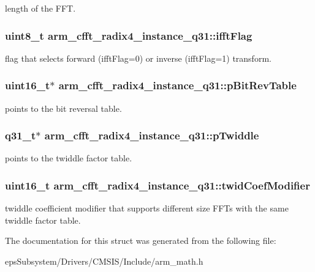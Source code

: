 length of the F\-F\-T. \hypertarget{structarm__cfft__radix4__instance__q31_adc0a62ba669ad2282ecbe43d5d96abab}{
\subsubsection[{ifft\-Flag}]{\setlength{\rightskip}{0pt plus 5cm}uint8\-\_\-t arm\-\_\-cfft\-\_\-radix4\-\_\-instance\-\_\-q31\-::ifft\-Flag}}\label{structarm__cfft__radix4__instance__q31_adc0a62ba669ad2282ecbe43d5d96abab}
flag that selects forward (ifft\-Flag=0) or inverse (ifft\-Flag=1) transform. \hypertarget{structarm__cfft__radix4__instance__q31_a33a3bc774c97373261699463c05dfe54}{
\subsubsection[{p\-Bit\-Rev\-Table}]{\setlength{\rightskip}{0pt plus 5cm}uint16\-\_\-t$\ast$ arm\-\_\-cfft\-\_\-radix4\-\_\-instance\-\_\-q31\-::p\-Bit\-Rev\-Table}}\label{structarm__cfft__radix4__instance__q31_a33a3bc774c97373261699463c05dfe54}
points to the bit reversal table. \hypertarget{structarm__cfft__radix4__instance__q31_a561c22dee4cbdcfa0fd5f15106ecc306}{
\subsubsection[{p\-Twiddle}]{\setlength{\rightskip}{0pt plus 5cm}q31\-\_\-t$\ast$ arm\-\_\-cfft\-\_\-radix4\-\_\-instance\-\_\-q31\-::p\-Twiddle}}\label{structarm__cfft__radix4__instance__q31_a561c22dee4cbdcfa0fd5f15106ecc306}
points to the twiddle factor table. \hypertarget{structarm__cfft__radix4__instance__q31_a8cf8187b8232815cf17ee82bf572ecf9}{
\subsubsection[{twid\-Coef\-Modifier}]{\setlength{\rightskip}{0pt plus 5cm}uint16\-\_\-t arm\-\_\-cfft\-\_\-radix4\-\_\-instance\-\_\-q31\-::twid\-Coef\-Modifier}}\label{structarm__cfft__radix4__instance__q31_a8cf8187b8232815cf17ee82bf572ecf9}
twiddle coefficient modifier that supports different size F\-F\-Ts with the same twiddle factor table. 

The documentation for this struct was generated from the following file\-:\begin{DoxyCompactItemize}
\item 
eps\-Subsystem/\-Drivers/\-C\-M\-S\-I\-S/\-Include/arm\-\_\-math.\-h\end{DoxyCompactItemize}
